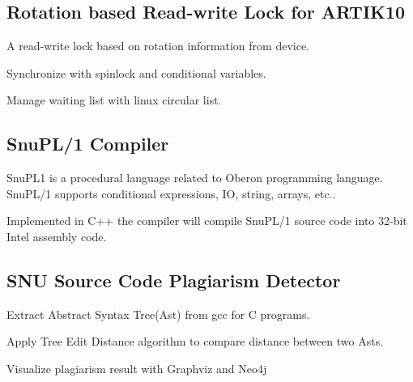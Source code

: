 \documentclass[letterpaper]{article}
\renewenvironment{itemize}{
  \begin{list}{}{
    \setlength{\leftmargin}{1.5em}
  }
}{
  \end{list}
}
\begin{document}
\subsection*{\textbf{Rotation based Read-write Lock for ARTIK10}}
\begin{itemize}
\item A read-write lock based on rotation information from device.	
\item Synchronize with spinlock and conditional variables.	
\item Manage waiting list with linux circular list.	\\
\end{itemize}
\subsection*{\textbf{SnuPL/1 Compiler}}
\begin{itemize}
\item SnuPL1 is a procedural language related to Oberon programming language. SnuPL/1 supports conditional expressions, IO, string, arrays, etc..
\item Implemented in C++ the compiler will compile SnuPL/1 source code into 32-bit Intel assembly code.	\\
\end{itemize}
\subsection*{\textbf{SNU Source Code Plagiarism Detector}}
\begin{itemize}
\item Extract Abstract Syntax Tree(Ast) from gcc for C programs.	
\item Apply Tree Edit Distance algorithm to compare distance between two Asts.	
\item Visualize plagiarism result with Graphviz and Neo4j	\\
\end{itemize}
\end{document}

